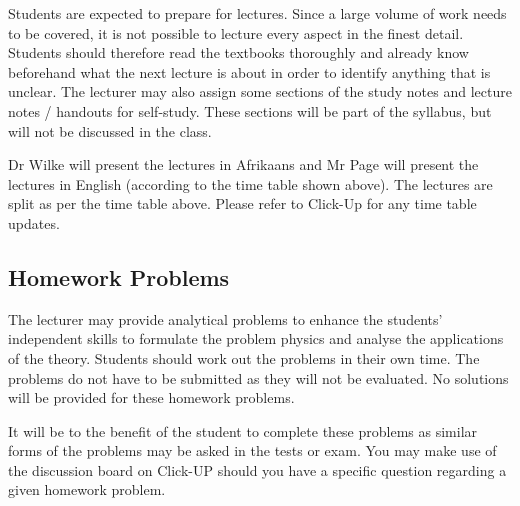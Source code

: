         Students are expected to prepare for lectures. Since a large volume of work
        needs to be covered, it is not possible to lecture every aspect in the
        finest detail. Students should therefore read the textbooks thoroughly
        and already know beforehand what the next lecture is about in order to
        identify anything that is unclear. The lecturer may also assign some
        sections of the study notes and lecture notes / handouts for self-study.
        These sections will be part of the syllabus, but will not be discussed
        in the class.

        Dr Wilke will present the lectures in Afrikaans and Mr Page will present
        the lectures in English (according to the time table shown above). The
        lectures are split as per the time table above. Please refer to Click-Up
        for any time table updates.

    \subsection{Homework Problems}
        The lecturer may provide analytical problems to enhance the students’
        independent skills to formulate the problem physics and analyse the
        applications of the theory. Students should work out the problems in
        their own time. The problems do not have to be submitted as they will
        not be evaluated. No solutions will be provided for these homework
        problems.

        It will be to the benefit of the student to complete these problems as
        similar forms of the problems may be asked in the tests or exam.
        You may make use of the discussion board on Click-UP should you have a
        specific question regarding a given homework problem.

